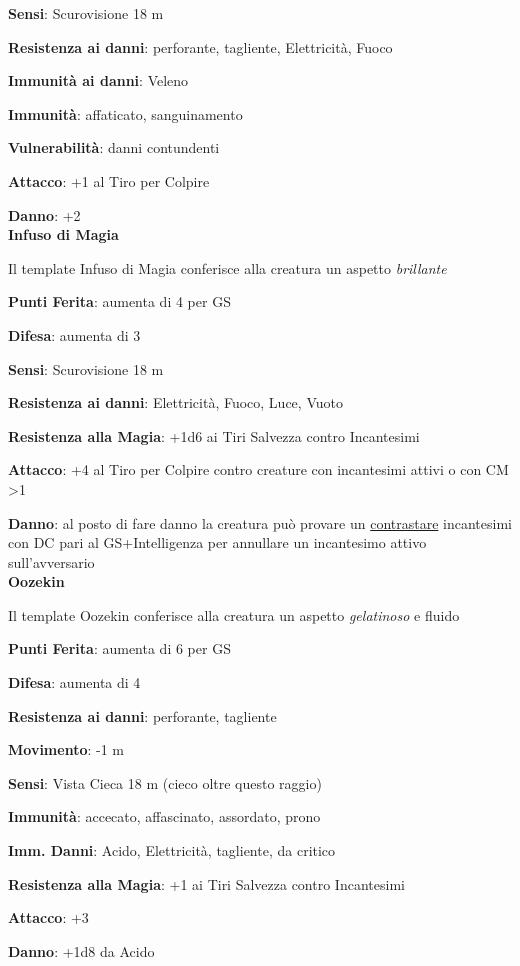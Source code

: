 \begin{multicols}{2}
\textbf{Sensi}: Scurovisione 18 m

\textbf{Resistenza ai danni}:  perforante, tagliente, Elettricità, Fuoco

\textbf{Immunità ai danni}: Veleno

\textbf{Immunità}: affaticato, sanguinamento

\textbf{Vulnerabilità}: danni contundenti

\textbf{Attacco}: +1 al Tiro per Colpire

\textbf{Danno}: +2\\

\textbf{Infuso di Magia}

Il template Infuso di Magia conferisce alla creatura un aspetto \emph{brillante}

\textbf{Punti Ferita}: aumenta di 4 per GS

\textbf{Difesa}: aumenta di 3

\textbf{Sensi}: Scurovisione 18 m

\textbf{Resistenza ai danni}:  Elettricità, Fuoco, Luce, Vuoto

\textbf{Resistenza alla Magia}: +1d6 ai Tiri Salvezza contro Incantesimi

\textbf{Attacco}: +4 al Tiro per Colpire contro creature con incantesimi attivi o con CM >1

\textbf{Danno}: al posto di fare danno la creatura può provare un \hyperlink{contrastareincantesimi}{contrastare} incantesimi con DC pari al GS+Intelligenza per annullare un incantesimo attivo sull'avversario\\

\textbf{Oozekin}

Il template Oozekin conferisce alla creatura un aspetto \emph{gelatinoso} e fluido

\textbf{Punti Ferita}: aumenta di 6 per GS

\textbf{Difesa}: aumenta di 4

\textbf{Resistenza ai danni}:  perforante, tagliente

\textbf{Movimento}: -1 m

\textbf{Sensi}: Vista Cieca 18 m (cieco oltre questo raggio)

\textbf{Immunità}: accecato, affascinato, assordato, prono

\textbf{Imm. Danni}: Acido, Elettricità, tagliente, da critico

\textbf{Resistenza alla Magia}: +1 ai Tiri Salvezza contro Incantesimi

\textbf{Attacco}: +3

\textbf{Danno}: +1d8 da Acido

\end{multicols}

